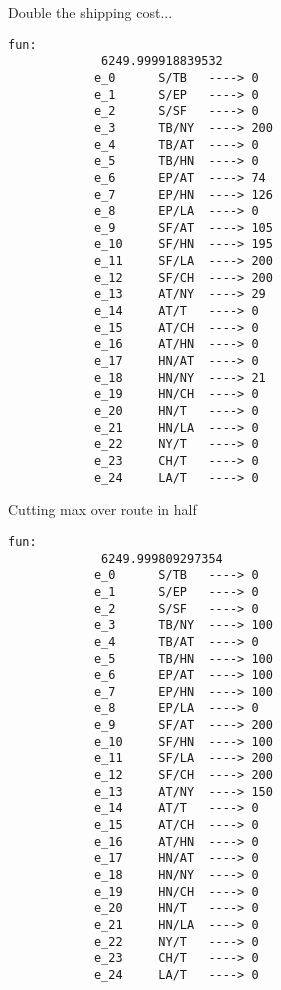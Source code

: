 \documentclass[11pt]{article}
\begin{document}
    \begin{minipage}[t]{0.42\linewidth}
        Double the shipping cost...
        \begin{lstlisting}[gobble=12, basicstyle=\small]
            fun:
             6249.999918839532
            e_0  	 S/TB 	----> 0
            e_1  	 S/EP 	----> 0
            e_2  	 S/SF 	----> 0
            e_3  	 TB/NY 	----> 200
            e_4  	 TB/AT 	----> 0
            e_5  	 TB/HN 	----> 0
            e_6  	 EP/AT 	----> 74
            e_7  	 EP/HN 	----> 126
            e_8  	 EP/LA 	----> 0
            e_9  	 SF/AT 	----> 105
            e_10  	 SF/HN 	----> 195
            e_11  	 SF/LA 	----> 200
            e_12  	 SF/CH 	----> 200
            e_13  	 AT/NY 	----> 29
            e_14  	 AT/T 	----> 0
            e_15  	 AT/CH 	----> 0
            e_16  	 AT/HN 	----> 0
            e_17  	 HN/AT 	----> 0
            e_18  	 HN/NY 	----> 21
            e_19  	 HN/CH 	----> 0
            e_20  	 HN/T 	----> 0
            e_21  	 HN/LA 	----> 0
            e_22  	 NY/T 	----> 0
            e_23  	 CH/T 	----> 0
            e_24  	 LA/T 	----> 0
        \end{lstlisting}
    \end{minipage} \hfill \vline \hfill %
    \begin{minipage}[t]{0.42\linewidth}
        Cutting max over route in half
        \begin{lstlisting}[gobble=12, basicstyle=\small]
            fun:
             6249.999809297354
            e_0  	 S/TB 	----> 0
            e_1  	 S/EP 	----> 0
            e_2  	 S/SF 	----> 0
            e_3  	 TB/NY 	----> 100
            e_4  	 TB/AT 	----> 0
            e_5  	 TB/HN 	----> 100
            e_6  	 EP/AT 	----> 100
            e_7  	 EP/HN 	----> 100
            e_8  	 EP/LA 	----> 0
            e_9  	 SF/AT 	----> 200
            e_10  	 SF/HN 	----> 100
            e_11  	 SF/LA 	----> 200
            e_12  	 SF/CH 	----> 200
            e_13  	 AT/NY 	----> 150
            e_14  	 AT/T 	----> 0
            e_15  	 AT/CH 	----> 0
            e_16  	 AT/HN 	----> 0
            e_17  	 HN/AT 	----> 0
            e_18  	 HN/NY 	----> 0
            e_19  	 HN/CH 	----> 0
            e_20  	 HN/T 	----> 0
            e_21  	 HN/LA 	----> 0
            e_22  	 NY/T 	----> 0
            e_23  	 CH/T 	----> 0
            e_24  	 LA/T 	----> 0
        \end{lstlisting}
    \end{minipage}

    \newpage
    
\end{document}
